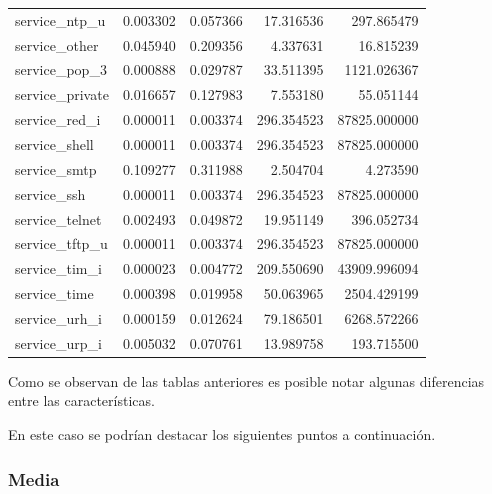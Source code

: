 \documentclass[12pt,a4paper]{article}
\begin{document}
\begin{longtable}{lrrrr}
  service_ntp_u & 0.003302 & 0.057366 & 17.316536 & 297.865479 \\
  service_other & 0.045940 & 0.209356 & 4.337631 & 16.815239 \\
  service_pop_3 & 0.000888 & 0.029787 & 33.511395 & 1121.026367 \\
  service_private & 0.016657 & 0.127983 & 7.553180 & 55.051144 \\
  service_red_i & 0.000011 & 0.003374 & 296.354523 & 87825.000000 \\
  service_shell & 0.000011 & 0.003374 & 296.354523 & 87825.000000 \\
  service_smtp & 0.109277 & 0.311988 & 2.504704 & 4.273590 \\
  service_ssh & 0.000011 & 0.003374 & 296.354523 & 87825.000000 \\
  service_telnet & 0.002493 & 0.049872 & 19.951149 & 396.052734 \\
  service_tftp_u & 0.000011 & 0.003374 & 296.354523 & 87825.000000 \\
  service_tim_i & 0.000023 & 0.004772 & 209.550690 & 43909.996094 \\
  service_time & 0.000398 & 0.019958 & 50.063965 & 2504.429199 \\
  service_urh_i & 0.000159 & 0.012624 & 79.186501 & 6268.572266 \\
  service_urp_i & 0.005032 & 0.070761 & 13.989758 & 193.715500 \\
\end{longtable}

Como se observan de las tablas anteriores es posible notar algunas diferencias entre las características.

En este caso se podrían destacar los siguientes puntos a continuación.

\subsubsection{Media}
\end{document}
